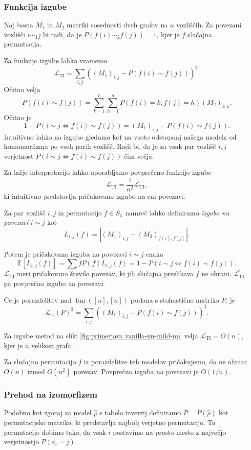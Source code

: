\documentclass[mat2, tisk]{fmfdelo}
\newcommand{\loss}{\mathcal L}
\newcommand{\fun}{\operatorname{fun}}
\newcommand{\funnn}[1]{\fun([#1], [#1])}
\newcommand{\Loss}[1]{\mathcal L _\text{#1}}
\begin{document}
\subsubsection{Funkcija izgube}
\label{funkcija izgube TI}
Naj bosta $M_1$ in $M_2$ matriki sosednosti dveh grafov
na $n$ vozliščih. Za povezani vozlišči $i \sim_1 j$ bi radi, da je
$P(f(i) \sim_2 f(j)) = 1$, kjer je $f$ slučajna permutacija.

Za funkcijo izgube lahko vzamemo
$$
\Loss{TI} = \sum_{i, j} ( (M_1)_{i,j} - P(f(i) \sim f(j)) )^2.
$$
Očitno velja
$$
P(f(i) \sim f(j)) = \sum_{k=1}^n \sum_{h=1}^n P(f(i) = k,
f(j) = h) (M_2)_{k,h}.
$$
Očitno je $$1-P(i \sim j \iff f(i) \sim f(j)) = (M_1)_{i,j} - P(f(i)
\sim f(j)).$$
Intuitivno lahko na izgubo  gledamo kot na vsoto
odstopanj našega modela od homomorfizma po vseh parih vozlišč.
Radi bi, da je za vsak par vozlišč $i,j$ verjetnost
$P(i \sim j \iff f(i) \sim f(j))$ čim večja.

Za lažjo interpretacijo lahko uporabljamo povprečeno funkcijo
izgube
$$
\overline{\Loss{TI}} = \frac{1}{n^2}\Loss{TI},
$$
ki intuitivno predstavlja pričakovano izgubo na eni povezavi.

Za par vozlišč $i,j$ in permutacijo $f\in S_n$ namreč lahko
definiramo \emph{izgubo na povezavi} $i \sim j$ kot
$$
L_{i,j}(f) = |(M_1)_{i,j} - (M_2)_{f(i),f(j)}|.
$$

Potem je pričakovana izguba na povezavi $i \sim j$ enaka
$$
\mathbb{E}[L_{i,j}(f)] = \sum{f} P(f) L_{i,j}(f)
= 1-P(i \sim j \iff f(i) \sim f(j)).
$$
$\Loss{TI}$ meri pričakovano število povezav,
ki jih slučajna preslikava $f$ ne ohrani,
$\overline{\Loss{TI}}$ pa povprečno izgubo na povezavi.
\begin{opomba}
  Če je porazdelitev nad
  $\funnn{n}$ podana s
  stohastično matriko $P$, je
  $$
  \loss_\sim (P)^2 = \sum_{i,j} ((M_1)_{i,j} - P(f(i) \sim f(j)))^2.
  $$
\end{opomba}
\begin{primer}
  Za izgube metod na sliki \ref{fig:primerjava vanilla-nn-mild-nn}
  velja $\Loss{TI} = O(n)$, kjer je $n$ velikost grafa.

  Za slučajno permutacijo $f$ iz porazdelitve teh modelov pričakujemo,
  da ne ohrani $O(n)$ izmed $O(n^2)$ povezav. Povprečna
  izguba na povezavi je $O(1/n)$.
\end{primer}
\subsubsection{Prehod na izomorfizem}
Podobno kot zgoraj za model $\hat \rho$ s tabelo inverzij definiramo
$\overline{P} = \overline{P}(\hat \rho)$ kot permutacijsko matriko,
ki predstavlja najbolj
verjetno permutacijo. To permutacijo dobimo tako,
da vsak $i$ postavimo na prosto mesto z največjo
verjetnostjo $P(a_i = j)$.
\end{document}

